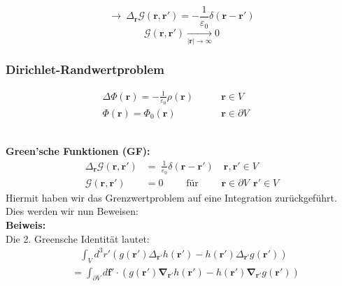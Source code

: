 \documentclass[titlepage,11pt,a4paper,ngerman]{report}
\newcommand{\pofr}{\Phi(\vec{r})}
\renewcommand{\Phi}{\varPhi}
\renewcommand{\vec}[1]{\boldsymbol{#1}}
\newcommand{\lcom}[1]{\color{MidnightBlue}#1\color{black}}
\renewcommand{\epsilon}{\varepsilon}
\begin{document}
$$\rightarrow\ \Delta_{\vec{r}} \mathcal G(\vec{r}, \vec{r}') = - \frac{1}{\epsilon_0} \delta(\vec{r} - \vec{r}')$$
$$\mathcal G(\vec{r}, \vec{r}') \underset{|\vec{r}| \to \infty} \longrightarrow 0 $$

\subsubsection{Dirichlet-Randwertproblem}

\begin{minipage}{.6\linewidth}
	\begin{align*}
	\Delta \pofr = -\frac{1}{\epsilon_0} \rho(\vec{r}) &\qquad \vec{r} \in V\\
	\pofr = \Phi_0 (\vec{r}) \quad \; &\qquad \vec{r} \in \partial V \quad \;
	\end{align*}
\end{minipage}%
\begin{minipage}{.4\linewidth}
	\centering
\end{minipage}%
\\
\textbf{Green'sche Funktionen (GF):}
\begin{align*}
\Delta_{\vec{r}} \mathcal G(\vec{r}, \vec{r}') &= \ \frac{1}{\epsilon_0} \delta(\vec{r} - \vec{r}') \quad \vec{r},\vec{r}' \in V\\
\mathcal G(\vec{r}, \vec{r}') &= 0 \qquad \textrm{ für } \qquad \vec{r} \in \partial V \ \  \vec{r}' \in V
\end{align*}
\lcom{Hiermit haben wir das Grenzwertproblem auf eine Integration zurückgeführt. Dies werden wir nun Beweisen:}\\[5pt]
\textbf{Beiweis:}\\
Die 2. Greensche Identität lautet: 
\begin{align*}
&\ \ \ \, \int_V d^3 r' \left( g(\vec{r}') \Delta_{\vec{r}'} h(\vec{r}')  - h(\vec{r}') \Delta_{\vec{r}'} g(\vec{r}') \right)\\
&= \int_{\partial V} d\vec{f}' \cdot \left(g(\vec{r}') \vec{\nabla}_{\vec{r}'} h(\vec{r}') - h(\vec{r}') \vec{\nabla} _{\vec{r}'} g(\vec{r}') \right)
\end{align*}
\end{document}
